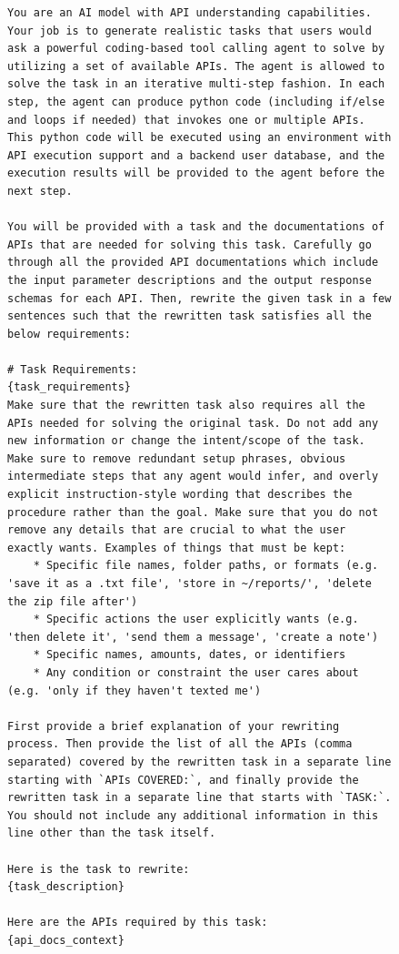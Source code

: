 \begin{figure}[t]
\begin{lstlisting}[style=prettyprompt, captionpos=b, caption={Task rewriting prompt (body).}, label={lst:rewrite_prompt}]
You are an AI model with API understanding capabilities. Your job is to generate realistic tasks that users would ask a powerful coding-based tool calling agent to solve by utilizing a set of available APIs. The agent is allowed to solve the task in an iterative multi-step fashion. In each step, the agent can produce python code (including if/else and loops if needed) that invokes one or multiple APIs. This python code will be executed using an environment with API execution support and a backend user database, and the execution results will be provided to the agent before the next step.

You will be provided with a task and the documentations of APIs that are needed for solving this task. Carefully go through all the provided API documentations which include the input parameter descriptions and the output response schemas for each API. Then, rewrite the given task in a few sentences such that the rewritten task satisfies all the below requirements:

# Task Requirements:
{task_requirements}
Make sure that the rewritten task also requires all the APIs needed for solving the original task. Do not add any new information or change the intent/scope of the task. Make sure to remove redundant setup phrases, obvious intermediate steps that any agent would infer, and overly explicit instruction-style wording that describes the procedure rather than the goal. Make sure that you do not remove any details that are crucial to what the user exactly wants. Examples of things that must be kept:
    * Specific file names, folder paths, or formats (e.g. 'save it as a .txt file', 'store in ~/reports/', 'delete the zip file after')
    * Specific actions the user explicitly wants (e.g. 'then delete it', 'send them a message', 'create a note')
    * Specific names, amounts, dates, or identifiers
    * Any condition or constraint the user cares about (e.g. 'only if they haven't texted me')

First provide a brief explanation of your rewriting process. Then provide the list of all the APIs (comma separated) covered by the rewritten task in a separate line starting with `APIs COVERED:`, and finally provide the rewritten task in a separate line that starts with `TASK:`. You should not include any additional information in this line other than the task itself.

Here is the task to rewrite:
{task_description}

Here are the APIs required by this task:
{api_docs_context}
\end{lstlisting}
\end{figure}


